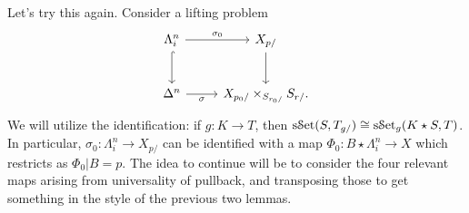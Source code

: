 Let's try this again. Consider a lifting problem
\[\begin{tikzcd}[row sep = 2.5em, column sep = 2.5em]
\Lambda _i^n \ar[" \sigma _0 ", r] \ar[hook, d]  & X_{p/} \ar[d]  \\
\Delta ^n \ar[" \sigma  "', r]  & X_{p_0/} \times _{S_{r_0/} } S_{r/} .
\end{tikzcd}\]
We will utilize the identification: if $g : K \to T$, then $\mathrm{s}\mathcal{S}\mathrm{et} (S,T_{g/} ) \cong \mathrm{s}\mathcal{S}\mathrm{et} _g(K\star S,T)$. In particular, $\sigma _0 : \Lambda _i^n \to X_{p/} $ can be identified with a map $\Phi _0 : B \star \Lambda _i^n \to X$ which restricts as $\Phi _0|B=p$. The idea to continue will be to consider the four relevant maps arising from universality of pullback, and transposing those to get something in the style of the previous two lemmas.
